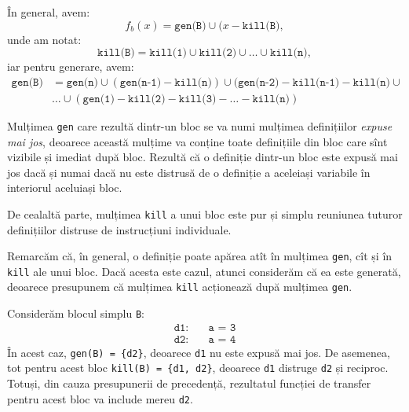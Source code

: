 În general, avem:
\begin{equation}
  \label{eq:fb}
  f_b(x) = \texttt{gen(B)} \cup (x - \texttt{kill(B)},
\end{equation}
unde am notat:
\[
  \texttt{kill(B)} = \texttt{kill(1)} \cup \texttt{kill(2)} \cup \dots \cup \texttt{kill(n)},
\]
iar pentru generare, avem:
\begin{align*}
  \texttt{gen(B)} &= \texttt{gen(n)} \cup (\texttt{gen(n-1)} - \texttt{kill(n)}) \cup %
                    (\texttt{gen(n-2)} - \texttt{kill(n-1)} - \texttt{kill(n)} \cup \\
                  & \dots \cup (\texttt{gen(1)} - \texttt{kill(2)} - \texttt{kill(3)} - %
                    \dots - \texttt{kill(n)})
\end{align*}

Mulțimea \texttt{gen} care rezultă dintr-un bloc se va numi mulțimea definițiilor
\emph{expuse mai jos}, deoarece această mulțime va conține toate definițiile
din bloc care sînt vizibile și imediat după bloc. Rezultă că o definiție dintr-un
bloc este expusă mai jos dacă și numai dacă nu este distrusă de o definiție a
aceleiași variabile în interiorul aceluiași bloc.

De cealaltă parte, mulțimea \texttt{kill} a unui bloc este pur și simplu reuniunea
tuturor definițiilor distruse de instrucțiuni individuale.

Remarcăm că, în general, o definiție poate apărea atît în mulțimea \texttt{gen},
cît și în \texttt{kill} ale unui bloc. Dacă acesta este cazul, atunci
considerăm că ea este generată, deoarece presupunem că mulțimea \texttt{kill}
acționează după mulțimea \texttt{gen}.

\begin{example}\label{exm:gen-kill}
  Considerăm blocul simplu \texttt{B}:
  \begin{align*}
    \texttt{d1:} \quad & \texttt{a = 3} \\
    \texttt{d2:} \quad & \texttt{a = 4}
  \end{align*}
  În acest caz, \texttt{gen(B) = \{d2\}}, deoarece \texttt{d1} nu este expusă
  mai jos. De asemenea, tot pentru acest bloc \texttt{kill(B) = \{d1, d2\}}, deoarece \texttt{d1}
  distruge \texttt{d2} și reciproc. Totuși, din cauza presupunerii de precedență,
  rezultatul funcției de transfer pentru acest bloc va include mereu \texttt{d2}.
\end{example}


